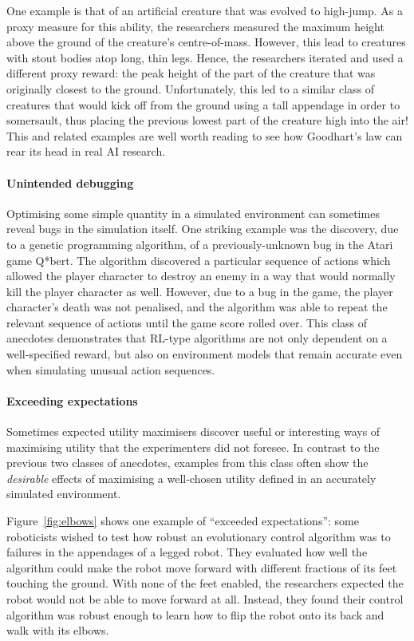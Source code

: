 \documentclass[11pt]{article}
\begin{document}
One example is that of an artificial creature that was evolved to high-jump.
%
As a proxy measure for this ability, the researchers measured the maximum height
above the ground of the creature's centre-of-mass.
%
However, this lead to creatures with stout bodies atop long, thin legs.
%
Hence, the researchers iterated and used a different proxy reward: the peak
height of the part of the creature that was originally closest to the ground.
%
Unfortunately, this led to a similar class of creatures that would kick off from
the ground using a tall appendage in order to somersault, thus placing the
previous lowest part of the creature high into the air!
%
This and related examples are well worth reading to see how Goodhart's law can
rear its head in real AI research.

\paragraph{Unintended debugging}
%
Optimising some simple quantity in a simulated environment can sometimes reveal
bugs in the simulation itself.
%
One striking example was the discovery, due to a genetic programming algorithm,
of a previously-unknown bug in the Atari game Q*bert.
%
The algorithm discovered a particular sequence of actions which allowed the
player character to destroy an enemy in a way that would normally kill the
player character as well.
%
However, due to a bug in the game, the player character's death was not
penalised, and the algorithm was able to repeat the relevant sequence of actions
until the game score rolled over.
%
This class of anecdotes demonstrates that RL-type algorithms are not only
dependent on a well-specified reward, but also on environment models that remain
accurate even when simulating unusual action sequences.

\paragraph{Exceeding expectations}
%
Sometimes expected utility maximisers discover useful or interesting ways of
maximising utility that the experimenters did not foresee.
%
In contrast to the previous two classes of anecdotes, examples from this class
often show the \textit{desirable} effects of maximising a well-chosen utility
defined in an accurately simulated environment.

Figure~\ref{fig:elbows} shows one example of ``exceeded expectations'': some
roboticists wished to test how robust an evolutionary control algorithm was to
failures in the appendages of a legged robot.
%
They evaluated how well the algorithm could make the robot move forward with
different fractions of its feet touching the ground.
%
With none of the feet enabled, the researchers expected the robot would not be
able to move forward at all.
%
Instead, they found their control algorithm was robust enough to learn how to
flip the robot onto its back and walk with its elbows.
\end{document}
